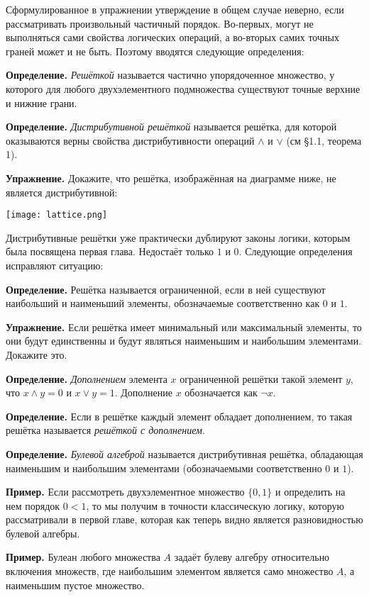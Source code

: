 Сформулированное в упражнении утверждение в общем случае неверно, если рассматривать произвольный частичный порядок. Во-первых, могут не выполняться сами свойства логических операций, а во-вторых самих точных граней может и не быть. Поэтому вводятся следующие определения:

{\bfseries Определение.} {\slshape Решёткой} называется частично упорядоченное множество, у которого для любого двухэлементного подмножества существуют точные верхние и нижние грани.

{\bfseries Определение.} {\slshape Дистрибутивной решёткой} называется решётка, для которой оказываются верны свойства дистрибутивности операций $\wedge$ и $\vee$ (см §1.1, теорема 1).

{\bfseries Упражнение.} Докажите, что решётка, изображённая на диаграмме ниже, не является дистрибутивной:

\texttt{[image: lattice.png]}

Дистрибутивные решётки уже практически дублируют законы логики, которым была посвящена первая глава. Недостаёт только $1$ и $0$. Следующие определения исправляют ситуацию:

{\bfseries Определение.} Решётка называется ограниченной, если в ней существуют наибольший и наименьший элементы, обозначаемые соответственно как $0$ и $1$.

{\bfseries Упражнение.} Если решётка имеет минимальный или максимальный элементы, то они будут единственны и будут являться наименьшим и наибольшим элементами. Докажите это.

{\bfseries Определение.} {\slshape Дополнением} элемента $x$ ограниченной решётки такой элемент $y$, что $x\wedge y = 0$ и $x \vee y = 1$. Дополнение $x$ обозначается как $\neg x$.

{\bfseries Определение.} Если в решётке каждый элемент обладает дополнением, то такая решётка называется {\slshape решёткой с дополнением}.

{\bfseries Определение.} {\slshape Булевой алгеброй} называется дистрибутивная решётка, обладающая наименьшим и наибольшим элементами (обозначаемыми соответственно $0$ и $1$).

{\bfseries Пример.} Если рассмотреть двухэлементное множество $\{0, 1\}$ и определить на нем порядок $0 < 1$, то мы получим в точности классическую логику, которую рассматривали в первой главе, которая как теперь видно является разновидностью булевой алгебры.

{\bfseries Пример.} Булеан любого множества $A$ задаёт булеву алгебру относительно включения множеств, где наибольшим элементом является само множество $A$, а наименьшим пустое множество.

